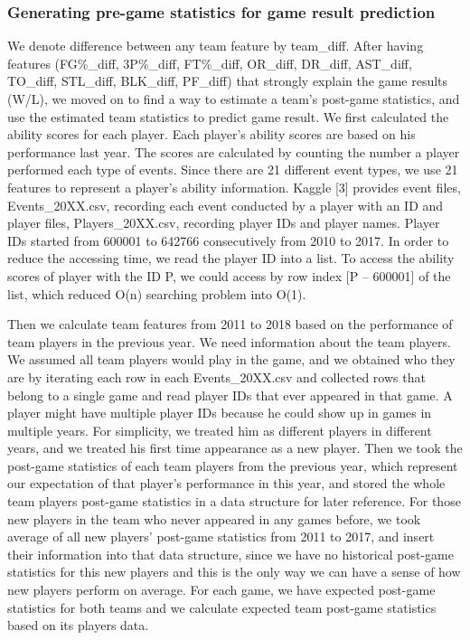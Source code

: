 \documentclass[12pt]{article}
\begin{document}
\subsubsection{Generating pre-game statistics for game result prediction}

\quad We denote difference between any team feature by team\_diff. After having features (FG\%\_diff, 3P\%\_diff, FT\%\_diff, OR\_diff, DR\_diff, AST\_diff, TO\_diff, STL\_diff, BLK\_diff, PF\_diff) that strongly explain the game results (W/L), we moved on to find a way to estimate a team’s post-game statistics, and use the estimated team statistics to predict game result. We first calculated the ability scores for each player. Each player’s ability scores are based on his performance last year. The scores are calculated by counting the number a player performed each type of events. Since there are 21 different event types, we use 21 features to represent a player’s ability information. Kaggle [3] provides event files, Events\_20XX.csv, recording each event conducted by a player with an ID and player files, Players\_20XX.csv, recording player IDs and player names. Player IDs started from 600001 to 642766 consecutively from 2010 to 2017. In order to reduce the accessing time, we read the player ID into a list. To access the ability scores of player with the ID P, we could access by row index [P – 600001] of the list, which reduced O(n) searching problem into O(1).

\quad Then we calculate team features from 2011 to 2018 based on the performance of team players in the previous year. We need information about the team players. We assumed all team players would play in the game, and we obtained who they are by iterating each row in each Events\_20XX.csv and collected rows that belong to a single game and read player IDs that ever appeared in that game. A player might have multiple player IDs because he could show up in games in multiple years. For simplicity, we treated him as different players in different years, and we treated his first time appearance as a new player. Then we took the post-game statistics of each team players from the previous year, which represent our expectation of that player’s performance in this year, and stored the whole team players post-game statistics in a data structure for later reference. For those new players in the team who never appeared in any games before, we took average of all new players’ post-game statistics from 2011 to 2017, and insert their information into that data structure, since we have no historical post-game statistics for this new players and this is the only way we can have a sense of how new players perform on average. For each game, we have expected post-game statistics for both teams and we calculate expected team post-game statistics based on its players data. \\
\end{document}
